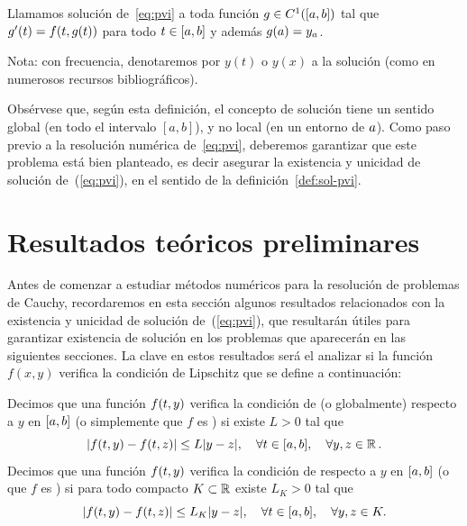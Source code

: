 \begin{definition}
  \label{def:sol-pvi}
  Llamamos solución de~\eqref{eq:pvi} a toda función $\sol\in
  C^1([\ta,\tb])$ tal que $\sol'(\tt)=f(\tt,\sol(\tt))$ para todo
  $\tt\in[\ta,\tb]$ y además $\sol(\ta)=\ycero$.\label{def:3}
\end{definition}

Nota: con frecuencia, denotaremos por $y(t)$ o $y(x)$ a la solución (como
  en numerosos recursos bibliográficos).

Obsérvese que, según esta definición, el concepto de solución tiene un
sentido global (en todo el intervalo $[a,b]$), y no local (en un entorno
de $\ta$). Como paso previo a la resolución numérica
de~\eqref{eq:pvi}, deberemos garantizar que este problema está bien
planteado, es decir asegurar la existencia y unicidad de solución
de~(\ref{eq:pvi}), en el sentido de la definición~\ref{def:sol-pvi}.

\section{Resultados teóricos preliminares}
\label{sec:tema4:resultados-teoricos}

Antes de comenzar a estudiar métodos numéricos para la resolución de
problemas de Cauchy, recordaremos en esta sección algunos
resultados relacionados con la existencia y unicidad de solución
de~(\ref{eq:pvi}), que resultarán útiles para garantizar existencia de
solución en los problemas que aparecerán en las siguientes secciones.
La clave en estos resultados será el analizar si la función $f(x,y)$
verifica la condición de Lipschitz que se define a continuación:

\begin{definition}
  \label{def:lipschitz}
  Decimos que una función $f(\tt,y)$ verifica la condición de
   (o globalmente) respecto a $y$ en
    $[\ta,\tb]$ (o simplemente que $f$ es \globLipschitz)
    si existe $L>0$ tal que
  \begin{equation*}
    |f(\tt,y) - f(\tt,z)| \le L |y-z|, \quad \forall \tt\in [\ta,\tb],
    \quad  \forall y,z\in \Rset.
  \end{equation*}
  Decimos que una función $f(\tt,y)$ verifica la condición de
   respecto a $y$ en
  $[\ta,\tb]$ (o que $f$ es \locLipschitz) si para todo compacto
  $K\subset\Rset$ existe $L_K>0$ tal que
  \begin{equation*}
    |f(\tt,y) - f(\tt,z)| \le L_K |y-z|, \quad \forall \tt\in [\ta,\tb],
    \quad  \forall y,z\in K.
  \end{equation*}
\end{definition}

